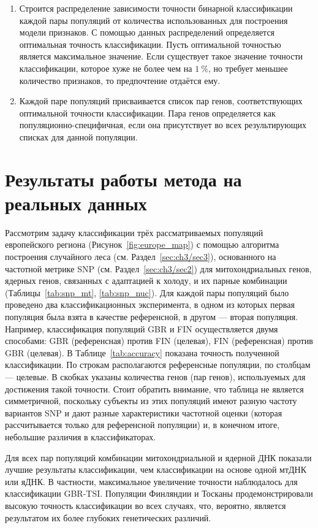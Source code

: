 \begin{enumerate}
	\item Строится распределение зависимости точности бинарной классификации каждой пары популяций от количества использованных для построения модели признаков. С помощью данных распределений определяется оптимальная точность классификации. Пусть оптимальной точностью является максимальное значение. Если существует такое значение точности классификации, которое хуже не более чем на $1~\%$, но требует меньшее количество признаков, то предпочтение отдаётся ему.
	\item Каждой паре популяций присваивается список пар генов, соответствующих оптимальной точности классификации. Пара генов определяется как популяционно-специфичная, если она присутствует во всех результирующих списках для данной популяции.
\end{enumerate}

\section{Результаты работы метода на реальных данных}\label{sec:ch3/sec4}

Рассмотрим задачу классификации трёх рассматриваемых популяций европейского региона (Рисунок~\ref{fig:europe_map}) с помощью алгоритма построения случайного леса (см. Раздел~\ref{sec:ch3/sec3}), основанного на частотной метрике SNP (см. Раздел~\ref{sec:ch3/sec2}) для митохондриальных генов, ядерных генов, связанных с адаптацией к холоду, и их парные комбинации (Таблицы~\ref{tab:snp_mt}, \ref{tab:snp_nuc}). Для каждой пары популяций было проведено два классификационных эксперимента, в одном из которых первая популяция была взята в качестве референсной, в другом --- вторая популяция. Например, классификация популяций GBR и FIN осуществляется двумя способами: GBR (референсная) против FIN (целевая), FIN (референсная) против GBR (целевая). В Таблице~\ref{tab:accuracy} показана точность полученной классификации. По строкам располагаются референсные популяции, по столбцам --- целевые. В скобках указаны количества генов (пар генов), используемых для достижения такой точности. Стоит обратить внимание, что таблица не является симметричной, поскольку субъекты из этих популяций имеют разную частоту вариантов SNP и дают разные характеристики частотной оценки (которая рассчитывается только для референсной популяции) и, в конечном итоге, небольшие различия в классификаторах.

Для всех пар популяций комбинации митохондриальной и ядерной ДНК показали лучшие результаты классификации, чем классификации на основе одной мтДНК или яДНК. В частности, максимальное увеличение точности наблюдалось для классификации GBR-TSI. Популяции Финляндии и Тосканы продемонстрировали высокую точность классификации во всех случаях, что, вероятно, является результатом их более глубоких генетических различий.


